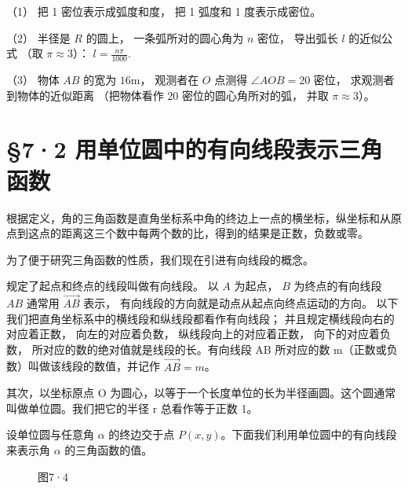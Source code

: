 （1） 把 1 密位表示成弧度和度， 把 1 弧度和 1 度表示成密位。

（2） 半径是 \(R\) 的圆上， 一条弧所对的圆心角为 \(n\) 密位， 导出弧长
\(l\) 的近似公式 （取 \(\pi \approx 3\)）： \(l = \frac{n\pi}{1000}\).

（3） 物体 \(AB\) 的宽为 \(16\mathrm{m}\)， 观测者在 \(O\) 点测得
\(\angle AOB = 20\) 密位， 求观测者到物体的近似距离 （把物体看作 20
密位的圆心角所对的弧， 并取 \(\pi \approx 3\)）。

\section{§7·2 用单位圆中的有向线段表示三角函数}

根据定义，角的三角函数是直角坐标系中角的终边上一点的横坐标，纵坐标和从原点到这点的距离这三个数中每两个数的比，得到的结果是正数，负数或零。

为了便于研究三角函数的性质，我们现在引进有向线段的概念。

规定了起点和终点的线段叫做有向线段。 以 \(A\) 为起点， \(B\)
为终点的有向线段 \(AB\) 通常用 \(\overrightarrow{AB}\) 表示，
有向线段的方向就是动点从起点向终点运动的方向。
以下我们把直角坐标系中的横线段和纵线段都看作有向线段；
并且规定横线段向右的对应着正数， 向左的对应着负数，
纵线段向上的对应着正数， 向下的对应着负数，
所对应的数的绝对值就是线段的长。有向线段 AB 所对应的数
m（正数或负数）叫做该线段的数值，并记作 \(\overrightarrow{AB}=m\)。

其次，以坐标原点 O
为圆心，以等于一个长度单位的长为半径画圆。这个圆通常叫做单位圆。我们把它的半径
r 总看作等于正数 1。

设单位圆与任意角 \(\alpha\) 的终边交于点
\(P(x, y)\)。下面我们利用单位圆中的有向线段来表示角 \(\alpha\)
的三角函数的值。

\begin{figure}
\centering
\caption{图7·4}
\end{figure}




